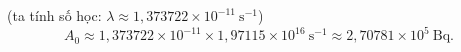 (ta tính số học: $\lambda \approx 1{,}373722 \times 10^{-11}\ \mathrm{s}^{-1}$)
\[
A_0 \approx 1{,}373722 \times 10^{-11} \times 1{,}97115 \times 10^{16}\ \mathrm{s}^{-1}
\approx 2{,}70781 \times 10^{5}\ \mathrm{Bq}.
\]
